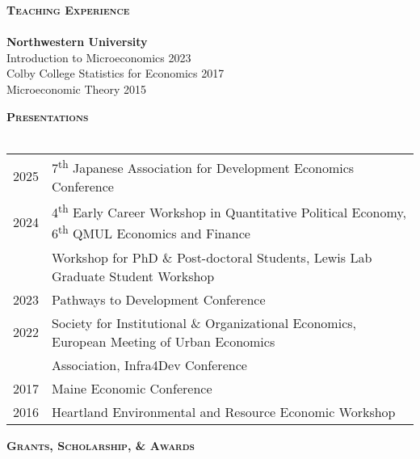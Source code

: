 \documentclass[11pt]{article}
\newcommand{\lineunder}{\vspace*{-8pt} \\ \hspace*{-18pt} \hrulefill \\}
\newcommand{\header}[1]{{\hspace*{-15pt}\vspace*{6pt} \textsc{#1}} \vspace*{-6pt} \lineunder}
\newcommand{\schoolwithcourses}[4]{
 \textbf{#1} \hfill{#2}\\
    #3\\
\vspace*{5pt}
}
\begin{document}

\header{\textbf{Teaching Experience}}
\schoolwithcourses{Northwestern University}{}{\hspace{2mm} Introduction to Microeconomics \hfill 2023}

\schoolwithcourses{Colby College}{}{\hspace{2mm} Statistics for Economics \hfill 2017 \\ \hspace{2mm} Microeconomic Theory \hfill 2015}
\hfill{}
\vspace{1mm}


\header{\textbf{Presentations}}
\vspace{1mm}

\begin{tabular}{l @{\hspace{10ex}} l }
	2025 & 7\textsuperscript{th} Japanese Association for Development Economics Conference \\ 
	2024 & 4\textsuperscript{th} Early Career Workshop in Quantitative Political Economy, 6\textsuperscript{th} QMUL Economics and Finance \\
	& Workshop for PhD \& Post-doctoral Students, Lewis Lab Graduate Student Workshop \\
	2023 & Pathways to Development Conference \\
	2022 & Society for Institutional \& Organizational Economics, European Meeting of Urban Economics \\
	& Association, Infra4Dev Conference \\
	2017 & Maine Economic Conference \\
	2016 & Heartland Environmental and Resource Economic Workshop  \\
\end{tabular}
\vspace{1mm}
\hfill{}




\header{\textbf{Grants, Scholarship, \& Awards}}
\vspace{1mm}
\end{document}
